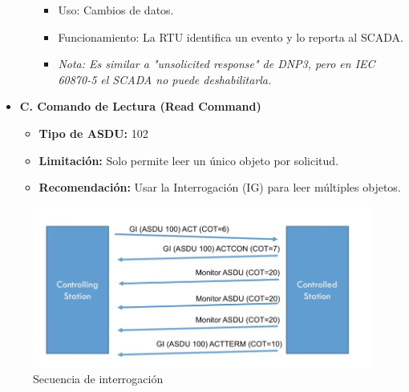 \documentclass[a5paper]{book}%
\begin{document}
\begin{itemize}
\begin{itemize}
		\begin{itemize}
			\item Uso: Cambios de datos.
			\item Funcionamiento: La RTU identifica un evento y lo reporta al SCADA.
			\item \textit{Nota: Es similar a "unsolicited response" de DNP3, pero en IEC 60870-5 el SCADA no puede deshabilitarla.}
		\end{itemize}
	\end{itemize}
	\item \textbf{C. Comando de Lectura (Read Command)}
	\begin{itemize}
		\item \textbf{Tipo de ASDU:} 102
		\item \textbf{Limitación:} Solo permite leer un único objeto por solicitud.
		\item \textbf{Recomendación:} Usar la Interrogación (IG) para leer múltiples objetos.
	\end{itemize}
\end{itemize}


\begin{figure}[H]
	\centering
	\caption{Secuencia de interrogación}
	\label{fig:secuenciadeinterrogacion}
	\includegraphics[width=\linewidth]{secuencia_de_interrogacion}
\end{figure}
\end{document}
